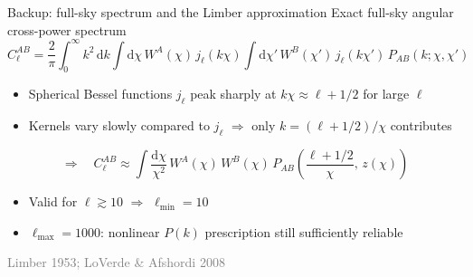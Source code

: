 \documentclass[aspectratio=1610, 10pt]{beamer}
\newcommand{\source}[1]{{\par\hfill\tiny\textcolor{gray}{#1}\par}}
\begin{document}
\begin{frame}{Backup: full-sky spectrum and the Limber approximation}
  Exact full-sky angular cross-power spectrum
  \begin{equation*}
    C_{\ell}^{AB} = \frac{2}{\pi} \int_0^\infty k^2\,\mathrm{d}k
    \int \mathrm{d}\chi\, W^{A}(\chi)\, j_{\ell}(k\chi)
    \int \mathrm{d}\chi'\, W^{B}(\chi')\, j_{\ell}(k\chi')\, P_{AB}(k;\chi,\chi')
  \end{equation*}
  \begin{itemize}
    \item Spherical Bessel functions $j_\ell$ peak sharply at $k\chi \approx \ell + 1/2$ for large $\ell$
    \item Kernels vary slowly compared to $j_\ell$ $\Rightarrow$ only $k = (\ell+1/2)/\chi$ contributes
  \end{itemize}
  \begin{equation*}
    \Rightarrow\quad
    C_{\ell}^{AB} \approx \int \frac{\mathrm{d}\chi}{\chi^2}\, W^{A}(\chi)\, W^{B}(\chi)\,
    P_{AB}\!\left(\frac{\ell+1/2}{\chi},\, z(\chi)\right)
  \end{equation*}
  \begin{itemize}
    \item Valid for $\ell \gtrsim 10$ $\Rightarrow$ $\ell_{\mathrm{min}} = 10$
    \item $\ell_{\mathrm{max}} = 1000$: nonlinear $P(k)$ prescription still sufficiently reliable
  \end{itemize}
  \source{Limber 1953; LoVerde \& Afshordi 2008}
\end{frame}
\end{document}
